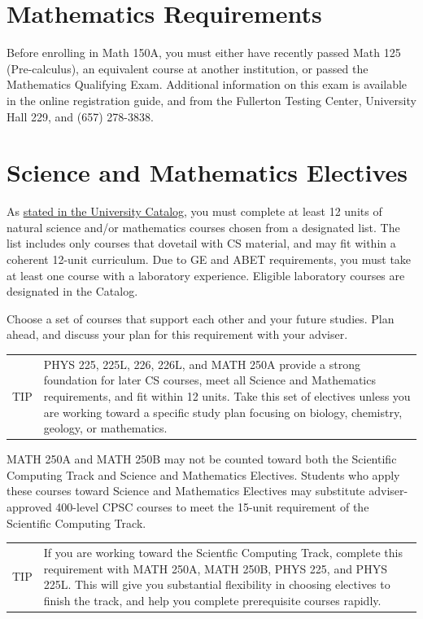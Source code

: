 \documentclass{book}
\newenvironment{tip}{
  \tcolorbox \begin{tabular}{m{.5in} m{5in}} \Large{TIP} &
}{
  \end{tabular} \endtcolorbox
}
\begin{document}
\section{Mathematics Requirements}

Before enrolling in Math 150A, you must either have recently passed Math 125 (Pre-calculus), an equivalent course at another institution, or passed the Mathematics Qualifying Exam. Additional information on this exam is available in the online registration guide, and from the Fullerton Testing Center, University Hall 229, and (657) 278-3838.

\section{Science and Mathematics Electives}

As \href{http://catalog.fullerton.edu/preview_program.php?catoid=2&poid=537&returnto=137}{stated in the University Catalog}, you must complete at least 12 units of natural science and/or mathematics courses chosen from a designated list. The list includes only courses that dovetail with CS material, and may fit within a coherent 12-unit curriculum. Due to GE and ABET requirements, you must take at least one course with a laboratory experience. Eligible laboratory courses are designated in the Catalog.

Choose a set of courses that support each other and your future studies. Plan ahead, and discuss your plan for this requirement with your adviser.

\begin{tip}
PHYS 225, 225L, 226, 226L, and MATH 250A provide a strong foundation for later CS courses, meet all Science and Mathematics requirements, and fit within 12 units. Take this set of electives unless you are working toward a specific study plan focusing on biology, chemistry, geology, or mathematics.
\end{tip}

MATH 250A and MATH 250B may not be counted toward both the Scientific Computing Track \sctrackindex and Science and Mathematics Electives. Students who apply these courses toward Science and Mathematics Electives may substitute adviser-approved 400-level CPSC courses to meet the 15-unit requirement of the Scientific Computing Track.

\begin{tip}
If you are working toward the Scientfic Computing Track, complete this requirement with  MATH 250A, MATH 250B, PHYS 225, and PHYS 225L. This will give you substantial flexibility in choosing electives to finish the track, and help you complete prerequisite courses rapidly.
\end{tip}
\end{document}
